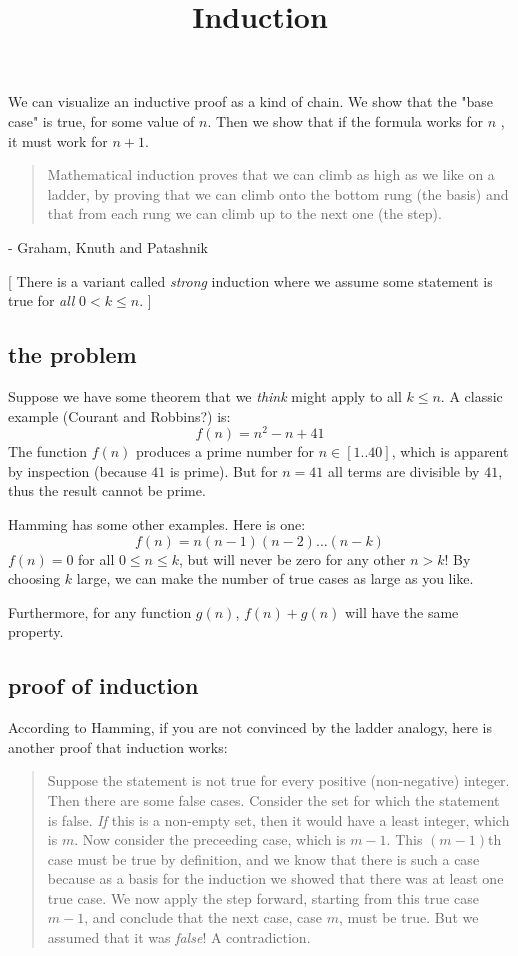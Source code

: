 \documentclass[11pt, oneside]{article}
\title{Induction}
\date{}
\begin{document}
\maketitle
\Large

\label{sec:Induction}

We can visualize an inductive proof as a kind of chain.  We show that the "base case" is true, for some value of $n$.  Then we show that if the formula works for $n$ , it must work for $n+1$.

\begin{quote}Mathematical induction proves that we can climb as high as we like on a ladder, by proving that we can climb onto the bottom rung (the basis) and that from each rung we can climb up to the next one (the step).\end{quote}

- Graham, Knuth and Patashnik

[ There is a variant called \emph{strong} induction where we assume some statement is true for \emph{all} $0 < k \le n$. ]

\subsection*{the problem}

Suppose we have some theorem that we \emph{think} might apply to all $k \le n$.  A classic example (Courant and Robbins?) is:
\[ f(n) = n^2 - n + 41 \]
The function $f(n)$ produces a prime number for $n \in [1..40]$, which is apparent by inspection (because $41$ is prime).  But for $n=41$ all terms are divisible by $41$, thus the result cannot be prime.

Hamming has some other examples.  Here is one:
\[ f(n) = n(n-1)(n-2) \dots (n-k) \]
$f(n)=0$ for all $0 \le n \le k$, but will never be zero for any other $n > k$!  By choosing $k$ large, we can make the number of true cases as large as you like.

Furthermore, for any function $g(n)$, $f(n) + g(n)$ will have the same property.

\subsection*{proof of induction}

According to Hamming, if you are not convinced by the ladder analogy, here is another proof that induction works:

\begin{quote}Suppose the statement is not true for every positive (non-negative) integer.  Then there are some false cases.  Consider the set for which the statement is false.  \emph{If} this is a non-empty set, then it would have a least integer, which is $m$.  Now consider the preceeding case, which is $m - 1$.  This $(m-1)$th case must be true by definition, and we know that there is such a case because as a basis for the induction we showed that there was at least one true case.  We now apply the step forward, starting from this true case $m-1$, and conclude that the next case, case $m$, must be true.  But we assumed that it was \emph{false}!  A contradiction. \end{quote}
\end{document}
